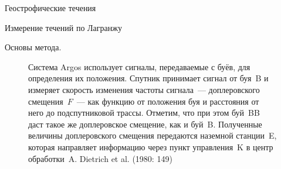 \begin{chapter}{Геострофические течения}
\begin{section}{Измерение течений по Лагранжу}
\begin{paragraph}{Основы метода.}
\begin{figure}[t!]
\caption{Система Argos использует сигналы, 
передаваемые с буёв, для определения их положения. 
Спутник принимает сигнал от буя~B и измеряет
скорость изменения частоты сигнала~--- доплеровского смещения~$F$~--- как
функцию от положения буя и расстояния от него до подспутниковой трассы. 
Отметим, что при этом буй~BB даст такое же доплеровское смещение, как и буй~B. 
Полученные величины доплеровского смещения передаются наземной станции~E, 
которая направляет информацию через пункт управления~K в центр обработки~A. 
Dietrich et al. (1980: 149)}
\label{fig:argos}
\end{figure}
%
\end{paragraph}


\end{section}
\end{chapter}

